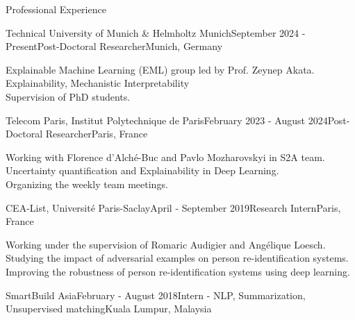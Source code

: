 \documentclass{resume} %
\begin{document}
\begin{rSection}{Professional Experience}

\begin{rSubsection}{Technical University of Munich \& Helmholtz Munich}{September 2024 - Present}{Post-Doctoral Researcher}{Munich, Germany}
\item[] Explainable Machine Learning (EML) group led by Prof. Zeynep Akata. \\
Explainability, Mechanistic Interpretability \\
Supervision of PhD students.
\end{rSubsection}

\begin{rSubsection}{Telecom Paris, Institut Polytechnique de Paris}{February 2023 - August 2024}{Post-Doctoral Researcher}{Paris, France}
\item[] Working with Florence d'Alché-Buc and Pavlo Mozharovskyi in S2A team. \\
Uncertainty quantification and Explainability in Deep Learning. \\
Organizing the weekly team meetings.
    
\end{rSubsection}

\begin{rSubsection}{CEA-List, Université Paris-Saclay}{April - September 2019}{Research Intern}{Paris, France}

\item[] Working under the supervision of Romaric Audigier and Angélique Loesch. \\ Studying the impact of adversarial examples on person re-identification systems. \\
Improving the robustness of person re-identification systems using deep learning.
\end{rSubsection}


\begin{rSubsection}{SmartBuild Asia}{February - August 2018}{Intern - NLP, Summarization, Unsupervised matching}{Kuala Lumpur, Malaysia}
\item[] 
\vspace{-15pt}
\end{rSubsection}


\end{rSection}
\end{document}
